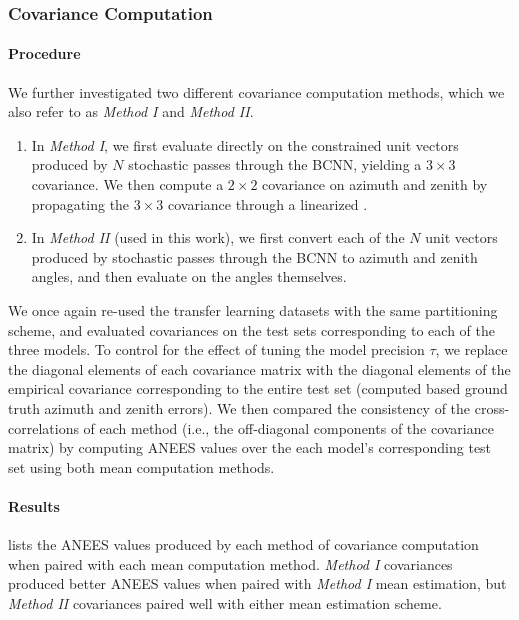 \subsubsection{Covariance Computation}
\paragraph{Procedure}
We further investigated two different covariance computation methods, which we also refer to as \emph{Method I} and \emph{Method II}. 

\begin{enumerate} 
\item In \emph{Method I}, we first evaluate  directly on the constrained unit vectors produced by $N$ stochastic passes through the BCNN, yielding a $3 \times 3$ covariance. 
We then compute a $2 \times 2$ covariance on azimuth and zenith by propagating the $3 \times 3$ covariance through a linearized .

\item In \emph{Method II} (used in this work), we first convert each of the $N$ unit vectors produced by stochastic passes through the BCNN to azimuth and zenith angles, and then evaluate  on the angles themselves.
\end{enumerate}

We once again re-used the transfer learning datasets with the same partitioning scheme, and evaluated covariances on the test sets corresponding to each of the three models. 
To control for the effect of tuning the model precision $\tau$, we replace the diagonal elements of each covariance matrix with the diagonal elements of the empirical covariance corresponding to the entire test set (computed based ground truth azimuth and zenith errors). 
We then compared the consistency of the cross-correlations of each method (i.e., the off-diagonal components of the covariance matrix) by computing ANEES values over the each model's corresponding test set using both mean computation methods.  

\paragraph{Results}
 lists the ANEES values produced by each method of covariance computation when paired with each mean computation method. 
\emph{Method I} covariances produced better ANEES values when paired with \emph{Method I} mean estimation, but \emph{Method II} covariances paired well with either mean estimation scheme. 

